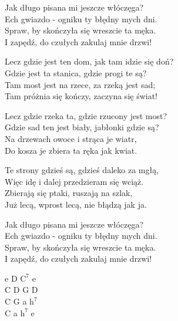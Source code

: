 \begin{text}
    Jak długo pisana mi jeszcze włóczęga?\\
    Ech gwiazdo - ogniku ty błędny mych dni.\\
    Spraw, by skończyła się wreszcie ta męka.\\
    I zapędź, do czułych zakulaj mnie drzwi!

    Lecz gdzie jest ten dom, jak tam idzie się doń?\\
    Gdzie jest ta stanica, gdzie progi te są?\\
    Tam most jest na rzece, za rzeką jest sad;\\
    Tam próżnia się kończy, zaczyna się świat!

    Lecz gdzie rzeka ta, gdzie rzucony jest most?\\
    Gdzie sad ten jest biały, jabłonki gdzie są?\\
    Na drzewach owoce i strąca je wiatr,\\
    Do kosza je zbiera ta ręka jak kwiat.

    Te strony gdzieś są, gdzieś daleko za mgłą,\\
    Więc idę i dalej przedzieram się wciąż.\\
    Zbierają się ptaki, ruszają na szlak,\\
    Już lecą, wprost lecą, nie błądzą jak ja.

    Jak długo pisana mi jeszcze włóczęga?\\
    Ech gwiazdo - ogniku ty błędny mych dni.\\
    Spraw, by skończyła się wreszcie ta męka.\\
    I zapędź, do czułych zakulaj mnie drzwi!
\end{text}
\begin{chord}
    e D $\mathrm{C^{7}}$ e\\
    C D G D\\
    C G a $\mathrm{h^{7}}$\\
    C a $\mathrm{h^{7}}$ e
\end{chord}
